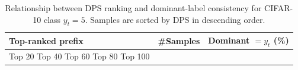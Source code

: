 \begin{table}[t]
\centering
\begin{tabular}{lrr}
\toprule
Top-ranked prefix & \#Samples & Dominant $= y_t$ (\%) \\
\midrule
Top 20%
Top 40%
Top 60%
Top 80%
Top 100%
\bottomrule
\caption{Relationship between DPS ranking and dominant-label consistency for CIFAR-10 class $y_t=5$. Samples are sorted by DPS in descending order.}
\label{tab:class_5_prefix}
\end{tabular}
\end{table}
